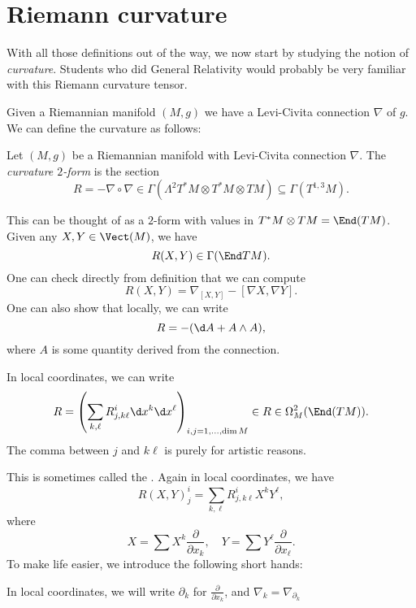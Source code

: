 \documentclass[a4paper]{article}
\begin{document}
\section{Riemann curvature}
With all those definitions out of the way, we now start by studying the notion of \emph{curvature}. Students who did General Relativity would probably be very familiar with this Riemann curvature tensor.

Given a Riemannian manifold $(M, g)$ we have a Levi-Civita connection $\nabla$ of $g$. We can define the curvature as follows:
\begin{defi}[Curvature]
  Let $(M, g)$ be a Riemannian manifold with Levi-Civita connection $\nabla$. The \emph{curvature $2$-form} is the section
  \[
    R = - \nabla \circ \nabla \in \Gamma(\Lambda^2 T^*M \otimes T^*M \otimes TM) \subseteq \Gamma(T^{1, 3}M).
  \]
\end{defi}
This can be thought of as a $2$-form with values in $T^*M \otimes TM = \End(TM)$. Given any $X, Y \in \Vect(M)$, we have
\[
  R(X, Y) \in \Gamma(\End TM) .
\]
One can check directly from definition that we can compute
\[
  R(X, Y) = \nabla_{[X, Y]} - [\nabla X, \nabla Y].
\]
One can also show that locally, we can write
\[
  R = -(\d A + A \wedge A),
\]
where $A$ is some quantity derived from the connection.

In local coordinates, we can write
\[
  R = \left(\sum_{k, \ell} R^i_{j, k\ell} \d x^k \d x^\ell\right)_{i, j = 1, \ldots, \dim M} \in R \in \Omega_M^2(\End(TM)).
\]
The comma between $j$ and $k\ell$ is purely for artistic reasons.

This is sometimes called the . Again in local coordinates, we have
\[
  R(X, Y)^i_j = \sum_{k, \ell} R^i_{j, k\ell} X^k Y^\ell,
\]
where
\[
  X = \sum X^k \frac{\partial}{\partial x_k},\quad Y = \sum Y^\ell \frac{\partial}{\partial x_\ell}.
\]
To make life easier, we introduce the following short hands:
\begin{notation}
  In local coordinates, we will write $\partial_k$ for $\frac{\partial}{\partial x_k}$, and $\nabla_k = \nabla_{\partial_k}$
\end{notation}
\end{document}
